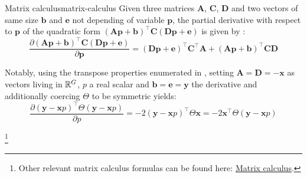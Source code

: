 \begin{Property}{Matrix calculus}{matrix-calculus}
Given three matrices $\boldsymbol{A}$, $\boldsymbol{C}$, $\boldsymbol{D}$ and two vectors of same size $\boldsymbol{b}$ and $\boldsymbol{e}$ not depending of variable $\boldsymbol{p}$, the partial derivative with respect to $\boldsymbol{p}$ of the quadratic form $(\boldsymbol{A} \boldsymbol{p} + \boldsymbol{b})^\top \boldsymbol{C} (\boldsymbol{D} \boldsymbol{p} + \boldsymbol{e})$ is given by :
\begin{equation}
\label{eq:general-calculus-formula}
    \frac{\partial (\boldsymbol{A} \boldsymbol{p} + \boldsymbol{b})^\top \boldsymbol{C} (\boldsymbol{D} \boldsymbol{p} + \boldsymbol{e})}{\partial \boldsymbol{p}} = (\boldsymbol{D} \boldsymbol{p} + \boldsymbol{e})^\top \boldsymbol{C}^\top \boldsymbol{A} + (\boldsymbol{A} \boldsymbol{p} + \boldsymbol{b})^\top \boldsymbol{C} \boldsymbol{D}
\end{equation}

Notably, using the transpose properties enumerated in , setting $\boldsymbol{A} = \boldsymbol{D} = - \boldsymbol{x}$ as vectors living in $\mathbb{R}^G$, $p$ a real scalar and $\boldsymbol{b} = \boldsymbol{e} = \boldsymbol{y}$ the derivative  and additionally coercing $\Theta$ to be symmetric yields:
\begin{equation*}
\label{eq:general-calculus-formula-easy}
    \frac{\partial (\boldsymbol{y} - \boldsymbol{x} p)^\top \Theta (\boldsymbol{y} - \boldsymbol{x} p)}{\partial p} = -2  (\boldsymbol{y} - \boldsymbol{x} p)^\top \Theta \boldsymbol{x} = -2 \boldsymbol{x}^\top \Theta (\boldsymbol{y} - \boldsymbol{x} p)
\end{equation*}

\footnote{Other relevant matrix calculus formulas can be found here: \href{https://en.wikipedia.org/wiki/Matrix_calculus\#Scalar-by-vector}{Matrix calculus}.}
\end{Property}

